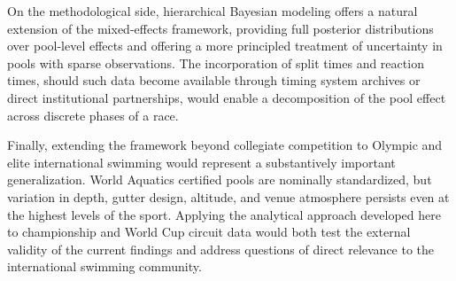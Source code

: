 \documentclass[12pt]{article}
\begin{document}
On the methodological side, hierarchical Bayesian modeling offers a natural
extension of the mixed-effects framework, providing full posterior distributions
over pool-level effects and offering a more principled treatment of uncertainty
in pools with sparse observations. The incorporation of split times and reaction
times, should such data become available through timing system archives or
direct institutional partnerships, would enable a decomposition of the pool
effect across discrete phases of a race.

Finally, extending the framework beyond collegiate competition to Olympic and
elite international swimming would represent a substantively important
generalization. World Aquatics certified pools are nominally standardized, but
variation in depth, gutter design, altitude, and venue atmosphere persists even
at the highest levels of the sport. Applying the analytical approach developed
here to championship and World Cup circuit data would both test the external
validity of the current findings and address questions of direct relevance to
the international swimming community.

\newpage
\printbibliography[title={Works Cited}]
\end{document}
